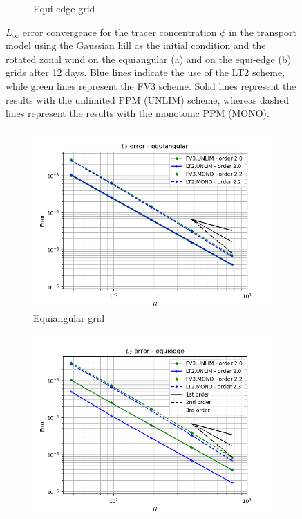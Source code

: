 \documentclass[preprint,12pt]{elsarticle}
\begin{document}
\begin{linenumbers}
\begin{figure}[!htb]
\begin{subfigure}{0.45\textwidth}
		\caption{Equi-edge grid\label{GH-equiedge-linf}}
	\end{subfigure}
	\caption{
	$L_{\infty}$ error convergence for the tracer concentration $\phi$ in the transport model using the Gaussian hill  as the initial condition and  the rotated zonal wind on the equiangular (a)
	and on the equi-edge  (b) grids after 12 days.
	Blue lines indicate the use of the LT2 scheme, while green lines represent the FV3 scheme.
	Solid lines represent the results with the unlimited PPM (UNLIM) scheme, whereas dashed lines represent the results with the monotonic PPM (MONO).
	\label{GH-linf}}
\end{figure}

\begin{figure}[!htb]
	\centering
	\begin{subfigure}{0.45\textwidth}
	\centering
	\includegraphics[width=1.1\linewidth]{l2error_tc-3_alpha45.equiangular}
	\caption{Equiangular grid\label{GH-equiangular-2}}
    \end{subfigure}
	\begin{subfigure}{0.45\textwidth}
		\centering
		\includegraphics[width=1.1\linewidth]{l2error_tc-3_alpha45.equiedge}

\end{subfigure}
\end{figure}
\end{linenumbers}
\end{document}
